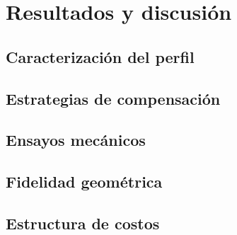 \chapter{Resultados y discusión}

\section{Caracterización del perfil}

\section{Estrategias de compensación}

\section{Ensayos mecánicos}

\section{Fidelidad geométrica}

\section{Estructura de costos}
